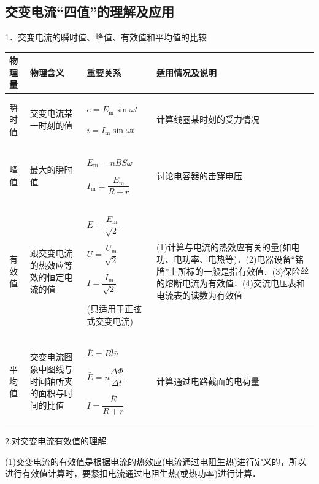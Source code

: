 \subsection{交变电流``四值''的理解及应用}

1．交变电流的瞬时值、峰值、有效值和平均值的比较

\begin{longtable}[]{@{}m{1.2cm}m{2.5cm}m{2.5cm}m{6cm}@{}}
\toprule
物理量 & 物理含义 & 重要关系 & 适用情况及说明\tabularnewline
\midrule
\endhead
\begin{minipage}[t]{0.22\columnwidth}\raggedright
瞬时值\strut
\end{minipage} &交变电流某一时刻的值 &$e=E_{\mathrm{m}} \sin \omega t$

$i=I_{\mathrm{m}} \sin \omega t$& 
计算线圈某时刻的受力情况\tabularnewline
\begin{minipage}[t]{0.22\columnwidth}\raggedright
峰值\strut
\end{minipage} & 
最大的瞬时值&$E_{\mathrm{m}} =n B S \omega$ 

 $I_{\mathrm{m}} =\dfrac{E_{\mathrm{m}}}{R+r} $&
讨论电容器的击穿电压\tabularnewline
\begin{minipage}[t]{0.22\columnwidth}\raggedright
有效值\strut
\end{minipage} &跟交变电流的热效应等效的恒定电流的值& 

$E=\dfrac{E_{\mathrm{m}}}{\sqrt{2}}$

$U=\dfrac{U_{\mathrm{m}}}{\sqrt{2}}$

$I=\dfrac{I_{\mathrm{m}}}{\sqrt{2}}$

(只适用于正弦式交变电流)&
(1)计算与电流的热效应有关的量(如电功、电功率、电热等)．(2)电器设备``铭牌''上所标的一般是指有效值．(3)保险丝的熔断电流为有效值．(4)交流电压表和电流表的读数为有效值\tabularnewline
\begin{minipage}[t]{0.22\columnwidth}\raggedright
平均值\strut
\end{minipage} & 交变电流图象中图线与时间轴所夹的面积与时间的比值& $ \bar{E} =B \bar{l} \bar{v}$

$ \bar{E} =n \dfrac{\Delta \Phi}{\Delta t} $

$ \bar{I} =\dfrac{\bar{E}}{R+r} $&
计算通过电路截面的电荷量\tabularnewline
\bottomrule
\end{longtable}

2.对交变电流有效值的理解

(1)交变电流的有效值是根据电流的热效应(电流通过电阻生热)进行定义的，所以进行有效值计算时，要紧扣电流通过电阻生热(或热功率)进行计算．

